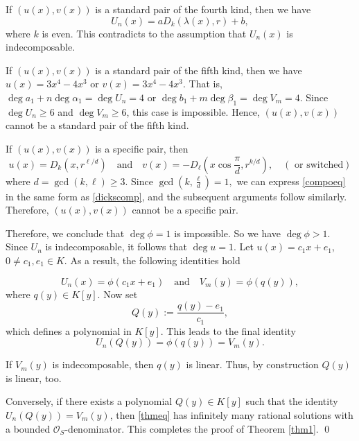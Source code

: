 \documentclass[12pt]{amsart}
\begin{document}
	If $(u(x),v(x))$ is a standard pair of the fourth kind, then we have 
	\[U_n(x)=aD_k(\lambda(x),r)+b,\] where $k$ is even. This contradicts to the assumption that $U_n(x)$ is indecomposable.
	
	If $(u(x),v(x))$ is a standard pair of the fifth kind, then we have $u(x)=3x^4-4x^3$ or $v(x)=3x^4-4x^3$.  That is, $\deg a_1+n\deg \alpha_1=\deg U_n=4$ or  $\deg b_1+m\deg \beta_1=\deg V_m=4$. Since $\deg U_n \geq 6$ and $\deg V_m \geq 6$, this case is impossible. Hence, $(u(x),v(x))$ cannot be a standard pair of the fifth kind.

    If $(u(x),v(x))$ is a  specific pair, then
    \begin{equation*}
        u(x)=D_k(x,r^{\ell/d}) \quad \text{and}\quad v(x)=-D_{\ell}\left(x\cos \frac{\pi}{d}, r^{k/d}\right), \quad (\text{ or  switched})
    \end{equation*} where $d=\gcd(k,\ell)\geq 3$. Since $\gcd(k,\frac{\ell}{d})=1,$ we can express \eqref{compoeq} in the same form as \eqref{dickscomp}, and the subsequent arguments follow similarly. Therefore, $(u(x),v(x))$ cannot be a specific pair.
    
	Therefore, we conclude that $\deg \phi=1$ is impossible. So we have $\deg \phi>1$. Since $U_n$ is indecomposable, it follows that $\deg u=1$. Let $u(x)=c_1x+e_1$, $0\neq c_1, e_1\in K$. As a result, the following identities hold
    
	\[U_n(x)=\phi(c_1x+e_1) \quad \text{and} \quad V_m(y)=\phi(q(y)),\] where $q(y)\in K[y]$. Now set 
	\[Q(y):=\frac{q(y)-e_1}{c_1},\] which defines a polynomial in $K[y]$. This leads to the final identity
	\[U_n(Q(y))=\phi(q(y))=V_m(y).\]

    If $V_m(y)$ is indecomposable, then $q(y)$ is linear. Thus, by construction $Q(y)$ is linear, too.
	
	Conversely, if there exists a polynomial $Q(y)\in K[y]$ such that the identity $U_n(Q(y))=V_m(y)$, then \eqref{thmeq} has infinitely many rational solutions with a bounded $\mathcal{O}_S$-denominator. This completes the proof of Theorem \ref{thm1}. \qed
\end{document}
